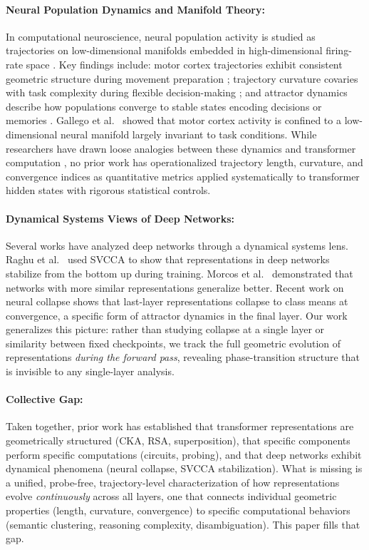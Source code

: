 \documentclass{article}
\begin{document}
\paragraph{Neural Population Dynamics and Manifold Theory:} In computational neuroscience, neural population activity is studied as trajectories on low-dimensional manifolds embedded in high-dimensional firing-rate space \cite{cunningham2014dimensionality, vyas2020computation}. Key findings include: motor cortex trajectories exhibit consistent geometric structure during movement preparation \cite{shenoy2013cortical}; trajectory curvature covaries with task complexity during flexible decision-making \cite{remington2018flexible}; and attractor dynamics describe how populations converge to stable states encoding decisions or memories \cite{hopfield1982neural}. Gallego et al.\ \cite{gallego2017neural} showed that motor cortex activity is confined to a low-dimensional neural manifold largely invariant to task conditions. While researchers have drawn loose analogies between these dynamics and transformer computation \cite{sussillo2014neural}, no prior work has operationalized trajectory length, curvature, and convergence indices as quantitative metrics applied systematically to transformer hidden states with rigorous statistical controls.

\paragraph{Dynamical Systems Views of Deep Networks:} Several works have analyzed deep networks through a dynamical systems lens. Raghu et al.\ \cite{raghu2017svcca} used SVCCA to show that representations in deep networks stabilize from the bottom up during training. Morcos et al.\ \cite{morcos2018insights} demonstrated that networks with more similar representations generalize better. Recent work on neural collapse \cite{papyan2020prevalence} shows that last-layer representations collapse to class means at convergence, a specific form of attractor dynamics in the final layer. Our work generalizes this picture: rather than studying collapse at a single layer or similarity between fixed checkpoints, we track the full  geometric evolution of representations \textit{during the forward pass}, 
revealing phase-transition structure that is invisible to any single-layer analysis.

\paragraph{Collective Gap:} Taken together, prior work has established that transformer representations are geometrically structured (CKA, RSA, superposition), that specific components perform specific computations (circuits, probing), and that deep networks exhibit dynamical phenomena (neural collapse, SVCCA stabilization). What is missing is a unified, probe-free, trajectory-level characterization of how representations evolve \textit{continuously} across all layers, one that connects individual geometric properties (length, curvature, convergence) to specific computational behaviors (semantic clustering, reasoning complexity, disambiguation). This paper fills that gap.
\end{document}
